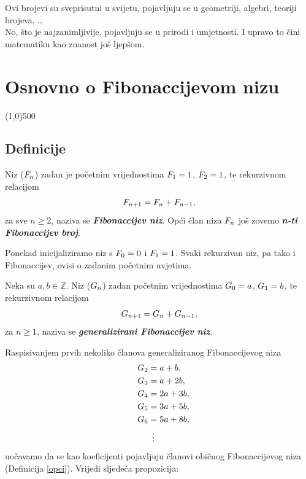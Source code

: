 \documentclass[14pt]{scrartcl}
\begin{document}
Ovi brojevi su sveprisutni u svijetu, pojavljuju se u geometriji, algebri, teoriji brojeva, \ldots \\
No, \v{s}to je najzanimljivije, pojavljuju se u prirodi i umjetnosti.
I upravo to \v{c}ini matematiku kao znanost još ljep\v{s}om.

\newpage
\section{Osnovno o Fibonaccijevom nizu}
\line(1,0){500}
\vspace{10mm}

\subsection{Definicije}
\vspace{5mm}

\begin{definicija}\label{opci}
Niz ($F\sb{n}$) zadan je po\v{c}etnim vrijednostima $F\sb{1} = 1$, $F\sb{2} = 1$, te rekurzivnom relacijom
\begin{equation}
F\sb{n+1}=F\sb{n}+F\sb{n-1},
\end{equation}
za sve $n \geq 2$, naziva se \emph{\textbf{Fibonaccijev niz}}. Op\'{c}i \v{c}lan niza $F\sb{n}$ jo\v{s} zovemo \emph{\textbf{n-ti Fibonaccijev broj}}.\\
\end{definicija}

Ponekad inicijaliziramo niz s $F\sb{0}=0$ i $F\sb{1}=1$.
Svaki rekurzivan niz, pa tako i Fibonaccijev, ovisi o zadanim po\v{c}etnim uvjetima.\\

\begin{definicija}\label{generalizirani}
Neka su $a, b\in\mathbb{Z}$. Niz ($G\sb{n}$) zadan po\v{c}etnim vrijednostima $G\sb{0} = a$, $G\sb{1} = b$, te rekurzivnom relacijom
\begin{equation}
G\sb{n+1} = G\sb{n}+G\sb{n-1},
\end{equation}
za $n \geq 1$, naziva se \emph{\textbf{generalizirani Fibonaccijev niz}}.
\end{definicija}

Raspisivanjem prvih nekoliko \v{c}lanova generaliziranog Fibonaccijevog niza 
\begin{gather*}
G\sb{2} = a+b,\\
\quad \! \! \! G\sb{3} = a+2b,\\
\quad G\sb{4} = 2a+3b,\\
\quad G\sb{5} = 3a+5b,\\
\quad G\sb{6} = 5a+8b,\\
\! \! \! \! \! \! \! \! \vdots 
\end{gather*}
uo\v{c}avamo da se kao koeficijenti pojavljuju \v{c}lanovi obi\v{c}nog Fibonaccijevog niza (Definicija \ref{opci}). Vrijedi sljede\'{c}a propozicija:
\end{document}
